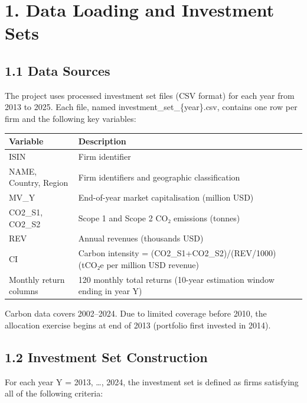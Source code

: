 \documentclass[
  11pt,
]{article}
\author{Group AN — North America + Europe}
\date{May 2026}
\begin{document}
\maketitle
\tableofcontents
\newpage




\hypertarget{data-loading-and-investment-sets}{%
\section{1. Data Loading and Investment
Sets}\label{data-loading-and-investment-sets}}

\hypertarget{data-sources}{%
\subsection{1.1 Data Sources}\label{data-sources}}

The project uses processed investment set files (CSV format) for each
year from 2013 to 2025. Each file, named investment\_set\_\{year\}.csv,
contains one row per firm and the following key variables:

\begin{longtable}[]{@{}ll@{}}
\toprule
\textbf{Variable} & \textbf{Description}\tabularnewline
\midrule
\endhead
ISIN & Firm identifier\tabularnewline
NAME, Country, Region & Firm identifiers and geographic
classification\tabularnewline
MV\_Y & End-of-year market capitalisation (million USD)\tabularnewline
CO2\_S1, CO2\_S2 & Scope 1 and Scope 2 CO₂ emissions
(tonnes)\tabularnewline
REV & Annual revenues (thousands USD)\tabularnewline
CI & Carbon intensity = (CO2\_S1+CO2\_S2)/(REV/1000) (tCO₂e per million
USD revenue)\tabularnewline
Monthly return columns & 120 monthly total returns (10-year estimation
window ending in year Y)\tabularnewline
\bottomrule
\end{longtable}

Carbon data covers 2002--2024. Due to limited coverage before 2010, the
allocation exercise begins at end of 2013 (portfolio first invested in
2014).

\hypertarget{investment-set-construction}{%
\subsection{1.2 Investment Set
Construction}\label{investment-set-construction}}

For each year Y = 2013, \ldots, 2024, the investment set is defined as
firms satisfying all of the following criteria:
\end{document}
